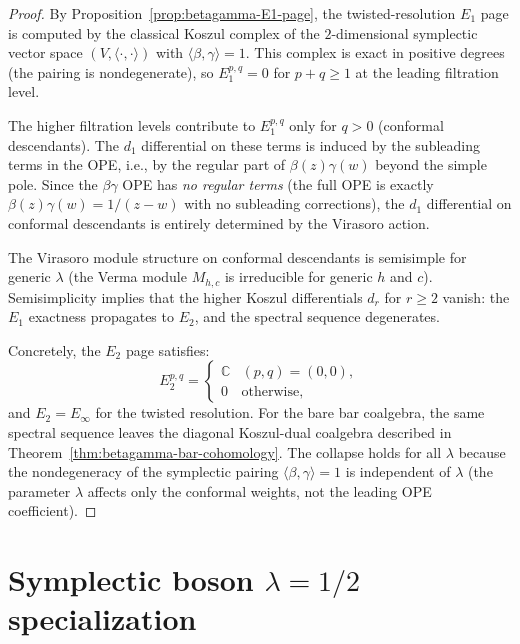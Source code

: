 \begin{proof}
By Proposition~\ref{prop:betagamma-E1-page}, the twisted-resolution
$E_1$ page is computed by the classical Koszul complex of the
$2$-dimensional symplectic vector space
$(V, \langle\cdot,\cdot\rangle)$ with
$\langle\beta,\gamma\rangle = 1$. This complex is exact in
positive degrees (the pairing is nondegenerate), so
$E_1^{p,q} = 0$ for $p + q \geq 1$ at the leading filtration
level.

The higher filtration levels contribute to $E_1^{p,q}$ only
for $q > 0$ (conformal descendants). The $d_1$ differential
on these terms is induced by the subleading terms in the OPE,
i.e., by the regular part of $\beta(z)\gamma(w)$ beyond the
simple pole. Since the $\beta\gamma$ OPE has
\emph{no regular terms} (the full OPE is exactly
$\beta(z)\gamma(w) = 1/(z-w)$ with no subleading corrections),
the $d_1$ differential on conformal descendants is entirely
determined by the Virasoro action.

The Virasoro module structure on conformal descendants is
semisimple for generic $\lambda$ (the Verma module
$M_{h,c}$ is irreducible for generic $h$ and $c$).
Semisimplicity implies that the higher Koszul differentials
$d_r$ for $r \geq 2$ vanish: the $E_1$ exactness propagates
to $E_2$, and the spectral sequence degenerates.

Concretely, the $E_2$ page satisfies:
\[
E_2^{p,q} = \begin{cases}
\mathbb{C} & (p,q) = (0,0), \\
0 & \text{otherwise},
\end{cases}
\]
and $E_2 = E_\infty$ for the twisted resolution. For the bare bar
coalgebra, the same spectral sequence leaves the diagonal
Koszul-dual coalgebra described in
Theorem~\ref{thm:betagamma-bar-cohomology}.
The collapse holds for all $\lambda$ because the nondegeneracy
of the symplectic pairing $\langle \beta, \gamma \rangle = 1$
is independent of $\lambda$ (the parameter $\lambda$ affects
only the conformal weights, not the leading OPE coefficient).
\end{proof}


\section{Symplectic boson \texorpdfstring{$\lambda = 1/2$}{lambda = 1/2}
specialization}
\label{sec:symplectic-boson-bar}


